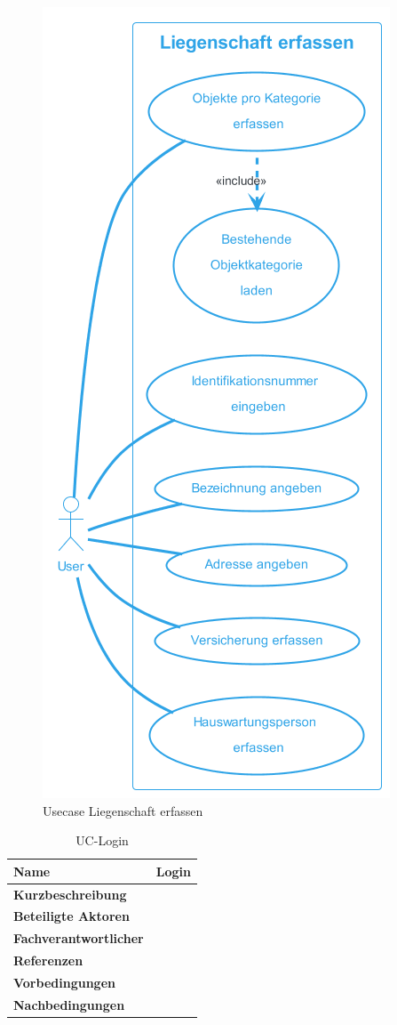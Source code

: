 \begin{figure}[H]
  \begin{center}
    \includegraphics[width=0.4\linewidth]{content/diagrams/out/usecase/liegenschaftErfassen/LiegenschaftErfassen.png}
    \caption{Usecase Liegenschaft erfassen}
  \end{center}
  \label{Liegenschaft}
\end{figure}

\begin{table}[H]
  \centering
  \settowidth{}
  \setlength\extrarowheight{2pt}
  \begin{tabulary}{1.0\textwidth}{|a|m{12cm}|}
    \hline
    \textbf{Name}& Login\\
    \hline 
    \textbf{Kurzbeschreibung} & \\
    \hline
    \textbf{Beteiligte Aktoren} & \\
    \hline
    \textbf{Fachverantwortlicher} & \\
    \hline
    \textbf{Referenzen} & \\
    \hline
    \textbf{Vorbedingungen} & \\
    \hline
    \textbf{Nachbedingungen} & \\
    \hline
  \end{tabulary}
  \caption{UC-Login}
\end{table}

